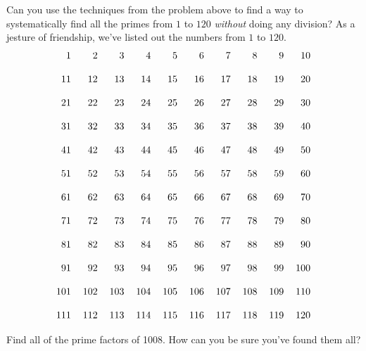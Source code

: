 \begin{prob} 
Can you use the techniques from the problem above to find a way to
systematically find all the primes from $1$ to $120$ \textit{without}
doing any division? As a jesture of friendship, we've listed out the
numbers from $1$ to $120$.
\[
\begin{tabular}{r r r r r r r r r r}

  1 &   2 &   3 &   4 &   5 &   6 &   7 &   8 &   9 &  10\\
  \\
 11 &  12 &  13 &  14 &  15 &  16 &  17 &  18 &  19 &  20\\
 \\
 21 &  22 &  23 &  24 &  25 &  26 &  27 &  28 &  29 &  30\\
 \\
 31 &  32 &  33 &  34 &  35 &  36 &  37 &  38 &  39 &  40\\
 \\
 41 &  42 &  43 &  44 &  45 &  46 &  47 &  48 &  49 &  50\\
 \\
 51 &  52 &  53 &  54 &  55 &  56 &  57 &  58 &  59 &  60\\
 \\
 61 &  62 &  63 &  64 &  65 &  66 &  67 &  68 &  69 &  70\\
 \\
 71 &  72 &  73 &  74 &  75 &  76 &  77 &  78 &  79 &  80\\
 \\
 81 &  82 &  83 &  84 &  85 &  86 &  87 &  88 &  89 &  90\\
 \\
 91 &  92 &  93 &  94 &  95 &  96 &  97 &  98 &  99 & 100\\
 \\
101 & 102 & 103 & 104 & 105 & 106 & 107 & 108 & 109 & 110\\
\\
111 & 112 & 113 & 114 & 115 & 116 & 117 & 118 & 119 & 120\\
\end{tabular}
\]
\end{prob}

\begin{prob}
Find all of the prime factors of 1008. How can you be sure you've
found them all?
\end{prob}
